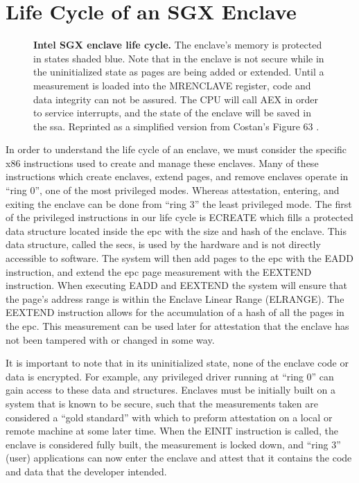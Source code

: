 \section{Life Cycle of an SGX Enclave}

\begin{figure}[ht]
\makebox[\textwidth][c]{}
\caption[Intel SGX Enclave Lifecycle]{\textbf{Intel SGX enclave life cycle.} The enclave's memory is protected in states shaded blue. Note that in the enclave is not secure while in the uninitialized state as pages are being added or extended. Until a measurement is loaded into the MRENCLAVE register, code and data integrity can not be assured. The CPU will call AEX in order to service interrupts, and the state of the enclave will be saved in the \gls{ssa}. Reprinted as a simplified version from Costan's Figure 63 \cite{Costan2016}.\label{figure:sgx-enclave-life-cycle}}
\end{figure}

In order to understand the life cycle of an enclave, we must consider the specific x86 instructions used to create and manage these enclaves. Many of these instructions which create enclaves, extend pages, and remove enclaves operate in ``ring 0'', one of the most privileged modes. Whereas attestation, entering, and exiting the enclave can be done from ``ring 3'' the least privileged mode. The first of the privileged instructions in our life cycle is ECREATE which fills a protected data structure located inside the \gls{epc} with the size and hash of the enclave. This data structure, called the \gls{secs}, is used by the hardware and is not directly accessible to software. The system will then add pages to the \gls{epc} with the EADD instruction, and extend the \gls{epc} page \gls{measurement} with the EEXTEND instruction. When executing EADD and EEXTEND the system will ensure that the page's address range is within the Enclave Linear Range (ELRANGE). The EEXTEND instruction allows for the accumulation of a hash of all the pages in the \gls{epc}. This measurement can be used later for \gls{attestation} that the enclave has not been tampered with or changed in some way.

It is important to note that in its uninitialized state, none of the enclave code or data is encrypted. For example, any privileged driver running at ``ring 0'' can gain access to these data and structures. Enclaves must be initially built on a system that is known to be secure, such that the measurements taken are considered a ``gold standard'' with which to preform attestation on a local or remote machine at some later time. When the EINIT instruction is called, the enclave is considered fully built, the measurement is locked down, and ``ring 3'' (user) applications can now enter the enclave and attest that it contains the code and data that the developer intended. 

